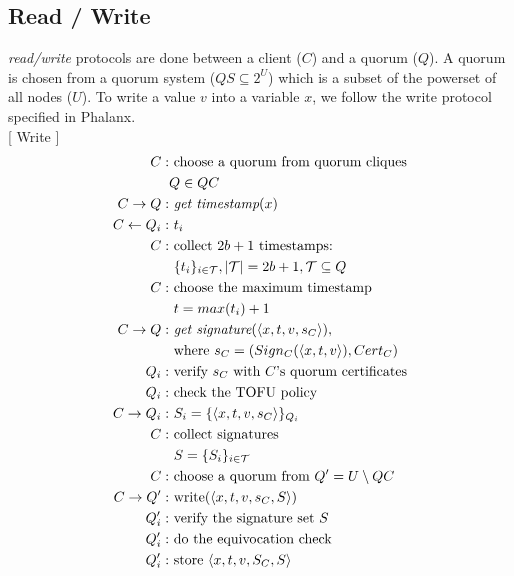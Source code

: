 \documentclass[twoside,twocolumn,10pt,fleqn]{article}
\begin{document}
\subsection{Read / Write}
\label{rw}
{\em read/write} protocols are done between a client ($C$) and a
quorum ($Q$). A quorum is chosen from a quorum system ($QS \subseteq
2^U$) which is a subset of the powerset of all nodes ($U$).  To write
a value $v$ into a variable $x$, we follow the write protocol
specified in Phalanx.\\

[ Write ]
\begin{align*}
  C :& \text{ choose a quorum from quorum cliques} \\
     & Q \in QC \\
  C \rightarrow Q :& \text{ {\em get timestamp}}(x) \\
  C \leftarrow Q_i :& \text{ } t_i \\
  C :& \text{ collect } 2b+1 \text{ timestamps: } \\
     & \text{ } \{t_i\}_{i \in \mathcal{T}}, |\mathcal{T}|=2b+1,
       \mathcal{T} \subseteq Q \\
  C :& \text{ choose the maximum timestamp } \\
     & \text{ } t = max(t_i) + 1 \\
  C \rightarrow Q :& \text{ {\em get signature}}(\langle x, t, v, s_C \rangle),\\
     & \text{ where } s_C = (Sign_C(\langle x, t, v \rangle), Cert_C) \\
  Q_i :& \text{ verify $s_C$ with $C$'s quorum certificates} \\
  Q_i :& \text{ check the TOFU policy} \\
  C \rightarrow Q_i :& \text{ } S_i = \{\langle x, t, v, s_C \rangle\}_{Q_i} \\
  C :& \text{ collect signatures } \\
     & \text{ } S = \{S_i\}_{i \in \mathcal{T}} \\
  C :& \text{ choose a quorum from } Q' = U \setminus QC \\
  C \rightarrow Q' :& \text{ write}(\langle x, t, v, s_C, S \rangle) \\
  Q'_i :& \text{ verify the signature set $S$} \\
  Q'_i :& \text{ do the equivocation check} \\
  Q'_i :& \text{ store } \langle x, t, v, S_C, S \rangle
\end{align*}
\end{document}

